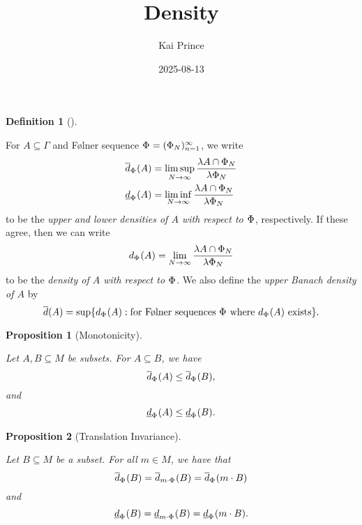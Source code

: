 \documentclass[
  british,
]{article}
\title{Density}
\author{Kai Prince}
\date{2025-08-13}
\renewcommand*\contentsname{Table of contents}
\newcommand\contentsname{Table of contents}
\theoremstyle{plain}
\newtheorem{proposition}{Proposition}[section]
\theoremstyle{plain}
\theoremstyle{definition}
\newtheorem{definition}{Definition}[section]
\theoremstyle{remark}
\newcommand{\Folner}[1][\vphantom{}]{{\Phi}_{#1}}
\newcommand{\Density}[2][\Folner]{d_{{#1}}({#2})}
\newcommand{\MonoidOperation}[2]{{#1}\cdot{#2}}
\newcommand{\UpperBanachDensity}[1]{\overline{d}({#1})}
\newcommand{\CountingMeasure}{{\lambda}}
\newcommand{\Group}{{\Gamma}}
\newcommand{\MonoidElement}{{m}}
\newcommand{\LowerDensity}[2][\Folner]{\underline{d}_{{#1}}({#2})}
\newcommand{\Monoid}{{M}}
\newcommand{\UpperDensity}[2][\Folner]{\overline{d}_{{#1}}({#2})}
\begin{document}
\maketitle

\renewcommand*\contentsname{Table of contents}
{
\hypersetup{linkcolor=}
\setcounter{tocdepth}{3}
\tableofcontents
}

\begin{definition}[]\protect\hypertarget{def-density}{}\label{def-density}

For \(A\subseteq\Group\) and Følner sequence
\(\Folner=(\Folner[N])_{n=1}^\infty\), we write \begin{align*}
    \UpperDensity{A}&=\limsup_{N\rightarrow\infty}\frac{\CountingMeasure{A\cap\Folner[N]}}{\CountingMeasure{\Folner[N]}}
    \\\LowerDensity{A}&=\liminf_{N\rightarrow\infty}\frac{\CountingMeasure{A\cap\Folner[N]}}{\CountingMeasure{\Folner[N]}}
\end{align*} to be the \emph{upper and lower densities of \(A\) with
respect to \(\Folner\)}, respectively. If these agree, then we can write
\[
\Density{A}=\lim_{N\rightarrow\infty}\frac{\CountingMeasure{A\cap\Folner[N]}}{\CountingMeasure{\Folner[N]}}
\] to be the \emph{density of \(A\) with respect to \(\Folner\)}. We
also define the \emph{upper Banach density of \(A\)} by \[
\UpperBanachDensity{A}=\sup\{d_{\Folner}(A):\text{for Følner sequences }\Folner\text{ where }d_{\Folner}(A)\text{ exists}\}.
\]

\end{definition}

\begin{proposition}[Monotonicity]\protect\hypertarget{prp-DensityMonotonicity}{}\label{prp-DensityMonotonicity}

Let \(A,B\subseteq\Monoid\) be subsets. For \(A\subseteq B\), we
have\[\UpperDensity{A}\leq\UpperDensity{B}, \]and\[\LowerDensity{A}\leq\LowerDensity{B}. \]

\end{proposition}

\begin{proposition}[Translation
Invariance]\protect\hypertarget{prp-DensityTranslationInvariance}{}\label{prp-DensityTranslationInvariance}

Let \(B\subseteq\Monoid\) be a subset. For all
\(\MonoidElement\in\Monoid\), we have that
\[\UpperDensity{B}=\UpperDensity[\MonoidOperation{\MonoidElement}{\Folner}]{B}=\UpperDensity{\MonoidOperation{\MonoidElement}{B}}\]
and
\[\LowerDensity{B}=\LowerDensity[\MonoidOperation{\MonoidElement}{\Folner}]{B}=\LowerDensity{\MonoidOperation{\MonoidElement}{B}}.\]

\end{proposition}
\end{document}
